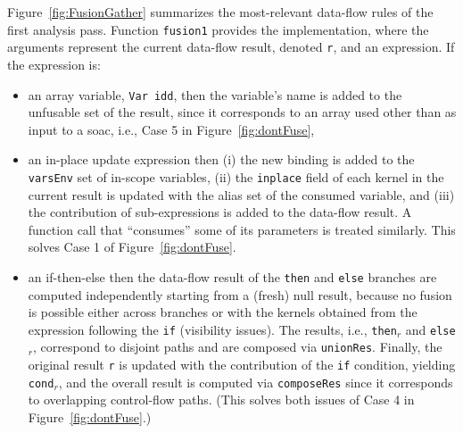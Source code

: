 \documentclass{sigplanconf}  %
\newcommand{\emp}[1]{\textcolor{DikuRed}{ #1}}
\begin{document}
Figure~\ref{fig:FusionGather} summarizes the most-relevant data-flow rules
of the first analysis pass. Function {\tt fusion1} provides the implementation,
where the arguments represent the current data-flow result, denoted {\tt r}, and an 
expression.   If the expression is:
\begin{itemize}
    \item an array variable, {\tt Var idd}, then the variable's 
            name is added to the unfusable set of the result,
            since it corresponds to an array used other than as 
            input to a {\sc soac}, i.e., \emp{Case 5} in Figure~\ref{fig:dontFuse},
    \item an in-place update expression then (i) the new binding is added to the
            {\tt varsEnv} set of in-scope variables, (ii) the {\tt inplace}
            field of each kernel in the current result is updated with the
            alias set of the consumed variable, and (iii) the contribution of
            sub-expressions is added to the data-flow result. A function call
                that ``consumes'' some of its parameters is treated similarly.
                This solves \emp{Case 1} of Figure~\ref{fig:dontFuse}.
    \item an if-then-else then the data-flow result of the {\tt then} and
            {\tt else} branches are computed independently starting from a 
            (fresh) null result, because no fusion is possible either across 
            branches or with the kernels obtained from the expression following 
            the {\tt if} (visibility issues). The results, i.e., {\tt then$_r$} and 
            {\tt else$_r$}, correspond to disjoint paths and are composed via 
            {\tt unionRes}.   Finally, the original result {\tt r} is updated 
            with the contribution of the {\tt if} condition, yielding {\tt cond$_r$},
            and the overall result is computed via {\tt composeRes} since it
            corresponds to overlapping control-flow paths.
            (This solves both issues of \emp{Case 4} in Figure~\ref{fig:dontFuse}.)            

\end{itemize}
\end{document}
